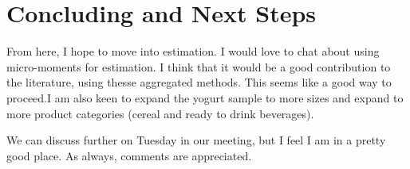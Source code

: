 \documentclass[11pt]{article}
\theoremstyle{definition}
\theoremstyle{remark}
\begin{document}
\section{Concluding and Next Steps}

From here, I hope to move into estimation. I would love to chat about using micro-moments for estimation. I think that it would be a good contribution to the literature, using thesse aggregated methods. This seems like a good way to proceed.I am also keen to expand the yogurt sample to more sizes and expand to more product categories (cereal and ready to drink beverages). 

We can discuss further on Tuesday in our meeting, but I feel I am in a pretty good place. As always, comments are appreciated.
\end{document}
